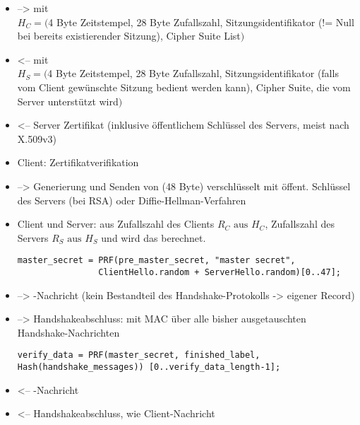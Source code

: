 \begin{itemize}
\item -->\clienthello{} mit \\
\(H_C = (\)4 Byte Zeitstempel, 28 Byte Zufallszahl, Sitzungsidentifikator (!= Null bei bereits existierender Sitzung), Cipher Suite List\()\)

\item <-- \serverhello{} mit \\
\(H_S = (\)4 Byte Zeitstempel, 28 Byte Zufallszahl, Sitzungsidentifikator (falls vom Client gewünschte Sitzung bedient werden kann), Cipher Suite, die vom Server unterstützt wird\()\)

\item <-- Server Zertifikat (inklusive öffentlichem Schlüssel des Servers, meist nach X.509v3)

\item Client: Zertifikatverifikation

\item --> Generierung und Senden von \premastersecret{} (48 Byte) verschlüsselt mit öffent. Schlüssel des Servers (bei RSA) oder Diffie-Hellman-Verfahren

\item Client und Server: aus Zufallszahl des Clients \(R_C \text{ aus } H_C\), Zufallszahl des Servers \(R_S \text{ aus } H_S\) und \premastersecret{} wird das \mastersecret{} berechnet.
\begin{lstlisting}
master_secret = PRF(pre_master_secret, "master secret",
				ClientHello.random + ServerHello.random)[0..47];
\end{lstlisting}

\item --> \changecipherspec{}-Nachricht (kein Bestandteil des Handshake-Protokolls -> eigener Record)

\item --> Handshakeabschluss: \finished{} mit MAC über alle bisher ausgetauschten Handshake-Nachrichten 
\begin{lstlisting}
verify_data = PRF(master_secret, finished_label, Hash(handshake_messages)) [0..verify_data_length-1];
\end{lstlisting}

\item <-- \changecipherspec{}-Nachricht

\item <-- Handshakeabschluss, wie Client-Nachricht
\end{itemize}

